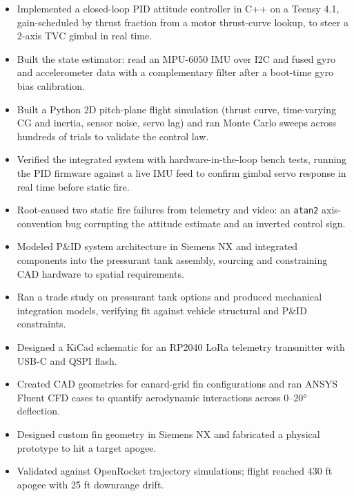 \begin{itemize}
  \item Implemented a closed-loop PID attitude controller in C++ on a Teensy 4.1, gain-scheduled by thrust fraction from a motor thrust-curve lookup, to steer a 2-axis TVC gimbal in real time.
  \item Built the state estimator: read an MPU-6050 IMU over I2C and fused gyro and accelerometer data with a complementary filter after a boot-time gyro bias calibration.
  \item Built a Python 2D pitch-plane flight simulation (thrust curve, time-varying CG and inertia, sensor noise, servo lag) and ran Monte Carlo sweeps across hundreds of trials to validate the control law.
  \item Verified the integrated system with hardware-in-the-loop bench tests, running the PID firmware against a live IMU feed to confirm gimbal servo response in real time before static fire.
  \item Root-caused two static fire failures from telemetry and video: an \texttt{atan2} axis-convention bug corrupting the attitude estimate and an inverted control sign.
\end{itemize}
\entrygap

\begin{itemize}
  \item Modeled P\&ID system architecture in Siemens NX and integrated components into the pressurant tank assembly, sourcing and constraining CAD hardware to spatial requirements.
  \item Ran a trade study on pressurant tank options and produced mechanical integration models, verifying fit against vehicle structural and P\&ID constraints.
  \item Designed a KiCad schematic for an RP2040 LoRa telemetry transmitter with USB-C and QSPI flash.
  \item Created CAD geometries for canard-grid fin configurations and ran ANSYS Fluent CFD cases to quantify aerodynamic interactions across 0--20° deflection.
\end{itemize}
\entrygap

\begin{itemize}
  \item Designed custom fin geometry in Siemens NX and fabricated a physical prototype to hit a target apogee.
  \item Validated against OpenRocket trajectory simulations; flight reached 430 ft apogee with 25 ft downrange drift.
\end{itemize}
\entrygap

